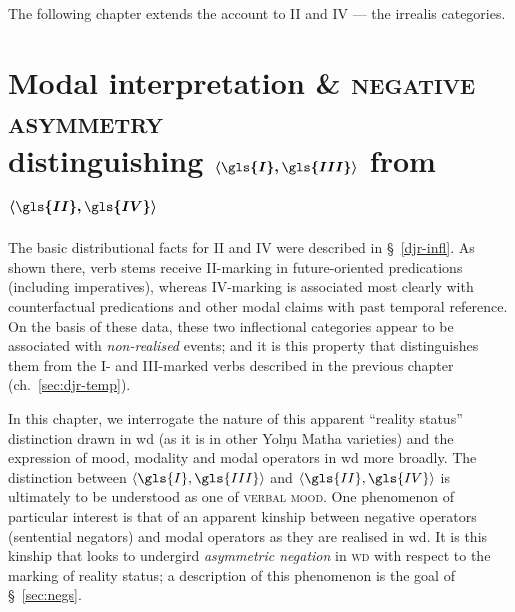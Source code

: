  The following chapter extends the account to \gls{II} and \gls{IV} --- the irrealis categories.



%
%
%

%


\chapter{Modal interpretation \& \textsc{negative asymmetry}\\{\large\sc distinguishing $\boldmath{ \langle \gls{I},\gls{III}\rangle}$ from $\boldmath{ \langle \gls{II},\gls{IV}\rangle}$}}\label{sec:yol-mood}

The basic distributional facts for \gls{II} and \gls{IV} were described in \S~\ref{djr-infl}. As shown there, verb stems receive \gls{II}-marking in future-oriented predications (including imperatives), whereas \gls{IV}-marking is associated most clearly with counterfactual predications and other modal claims with past temporal reference. On the basis of these data, these two inflectional categories appear to be associated with \textit{non-realised} events; and it is this property that distinguishes them from the \gls{I}- and \gls{III}-marked verbs described in the previous chapter (ch.~\ref{sec:djr-temp}).

In this chapter, we interrogate the nature of this apparent ``reality status'' distinction drawn in \gls{wd} (as it is in other Yolŋu Matha varieties) and the expression of mood, modality and modal operators in \gls{wd} more broadly. The distinction between $\langle \gls{I},\gls{III}\rangle$ and $\langle \gls{II},\gls{IV}\rangle$ is ultimately to be understood as one of \textsc{verbal mood}. One phenomenon of particular interest is that of an apparent kinship between negative operators (sentential negators) and modal operators as they are realised in \gls{wd}. It is this kinship that looks to undergird \textit{asymmetric negation} in \textsc{wd} with respect to the marking of reality status; a description of this phenomenon is the goal of \S~\ref{sec:negs}.


